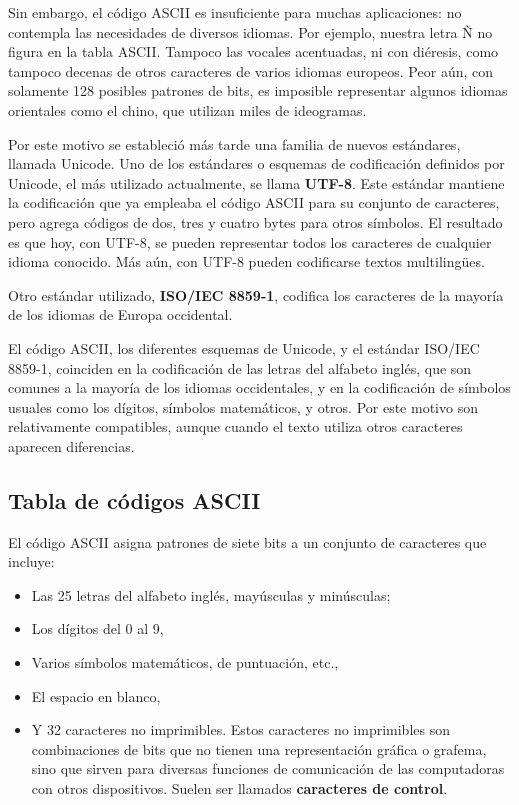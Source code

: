 \documentclass[spanish,a4paper,]{article}
\providecommand{\tightlist}{%
  \setlength{\itemsep}{0pt}\setlength{\parskip}{0pt}}
\begin{document}
Sin embargo, el código ASCII es insuficiente para muchas aplicaciones:
no contempla las necesidades de diversos idiomas. Por ejemplo, nuestra
letra Ñ no figura en la tabla ASCII. Tampoco las vocales acentuadas, ni
con diéresis, como tampoco decenas de otros caracteres de varios idiomas
europeos. Peor aún, con solamente 128 posibles patrones de bits, es
imposible representar algunos idiomas orientales como el chino, que
utilizan miles de ideogramas.

Por este motivo se estableció más tarde una familia de nuevos
estándares, llamada Unicode. Uno de los estándares o esquemas de
codificación definidos por Unicode, el más utilizado actualmente, se
llama \textbf{UTF-8}. Este estándar mantiene la codificación que ya
empleaba el código ASCII para su conjunto de caracteres, pero agrega
códigos de dos, tres y cuatro bytes para otros símbolos. El resultado es
que hoy, con UTF-8, se pueden representar todos los caracteres de
cualquier idioma conocido. Más aún, con UTF-8 pueden codificarse textos
multilingües.

Otro estándar utilizado, \textbf{ISO/IEC 8859-1}, codifica los
caracteres de la mayoría de los idiomas de Europa occidental.

El código ASCII, los diferentes esquemas de Unicode, y el estándar
ISO/IEC 8859-1, coinciden en la codificación de las letras del alfabeto
inglés, que son comunes a la mayoría de los idiomas occidentales, y en
la codificación de símbolos usuales como los dígitos, símbolos
matemáticos, y otros. Por este motivo son relativamente compatibles,
aunque cuando el texto utiliza otros caracteres aparecen diferencias.

\hypertarget{tabla-de-cuxf3digos-ascii}{%
\subsection{Tabla de códigos ASCII}\label{tabla-de-cuxf3digos-ascii}}

El código ASCII asigna patrones de siete bits a un conjunto de
caracteres que incluye:

\begin{itemize}
\tightlist
\item
  Las 25 letras del alfabeto inglés, mayúsculas y minúsculas;
\item
  Los dígitos del 0 al 9,
\item
  Varios símbolos matemáticos, de puntuación, etc.,
\item
  El espacio en blanco,
\item
  Y 32 caracteres no imprimibles. Estos caracteres no imprimibles son
  combinaciones de bits que no tienen una representación gráfica o
  grafema, sino que sirven para diversas funciones de comunicación de
  las computadoras con otros dispositivos. Suelen ser llamados
  \textbf{caracteres de control}.
\end{itemize}
\end{document}
